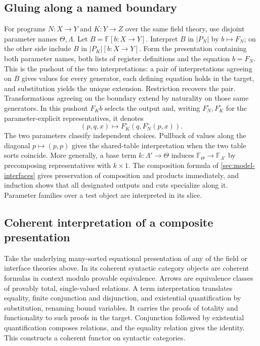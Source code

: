 \documentclass[11pt,a4paper]{article}
\theoremstyle{definition}
\theoremstyle{remark}\newaliascnt{remark}{theorem}
\numberwithin{equation}{section}
\begin{document}
\subsection{Gluing along a named boundary}
For programs \(N:X\to Y\) and \(K:Y\to Z\) over the same field theory, use disjoint parameter names \(\Theta,\Lambda\). Let \(B=\mathbb F[b:X\to Y]\). Interpret \(B\) in \(|P_N|\) by \(b\mapsto F_N\); on the other side include \(B\) in \(|P_K|[b:X\to Y]\). Form the presentation containing both parameter names, both lists of register definitions and the equation \(b=F_N\). This is the pushout of the two interpretations: a pair of interpretations agreeing on \(B\) gives values for every generator, each defining equation holds in the target, and substitution yields the unique extension. Restriction recovers the pair. Transformations agreeing on the boundary extend by naturality on those same generators. In this pushout \(F_K b\) selects the output and, writing \(F_N^\circ,F_K^\circ\) for the parameter-explicit representatives, it denotes
\[
  (p,q,x)\longmapsto F_K^\circ(q,F_N^\circ(p,x)).
\]
The two parameters classify independent choices. Pullback of values along the diagonal \(p\mapsto(p,p)\) gives the shared-table interpretation when the two table sorts coincide. More generally, a base term \(k:\Lambda'\to\Theta\) induces \(\mathbb F_\Theta\to\mathbb F_{\Lambda'}\) by precomposing representatives with \(k\times1\). The composition formula of \cref{sec:model-interfaces} gives preservation of composition and products immediately, and induction shows that all designated outputs and cuts specialize along it. Parameter families over a test object are interpreted in its slice.

\subsection{Coherent interpretation of a composite presentation}
Take the underlying many-sorted equational presentation of any of the field or interface theories above. In its coherent syntactic category objects are coherent formulas in context modulo provable equivalence. Arrows are equivalence classes of provably total, single-valued relations. A term interpretation translates equality, finite conjunction and disjunction, and existential quantification by substitution, renaming bound variables. It carries the proofs of totality and functionality to such proofs in the target. Conjunction followed by existential quantification composes relations, and the equality relation gives the identity. This constructs a coherent functor on syntactic categories.
\end{document}
